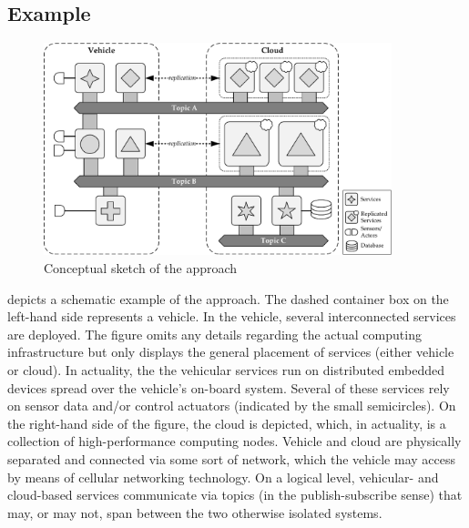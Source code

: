 \subsection{Example}
\begin{figure}[htpb]
  \centering
  \includegraphics[width=0.9\textwidth]{figures/idea.pdf}
  \caption[Conceptual sketch of the approach]{Conceptual sketch of the approach}\label{fig:idea}
\end{figure}
 depicts a schematic example of the approach. The dashed container box on the left-hand side represents a vehicle. In the vehicle, several interconnected services are deployed. The figure omits any details regarding the actual computing infrastructure but only displays the general placement of services (either vehicle or cloud). In actuality, the the vehicular services run on distributed embedded devices spread over the vehicle's on-board system. Several of these services rely on sensor data and/or control actuators (indicated by the small semicircles). On the right-hand side of the figure, the cloud is depicted, which, in actuality, is a collection of high-performance computing nodes. Vehicle and cloud are physically separated and connected via some sort of network, which the vehicle may access by means of cellular networking technology. On a logical level, vehicular- and cloud-based services communicate via topics (in the publish-subscribe sense) that may, or may not, span between the two otherwise isolated systems.

